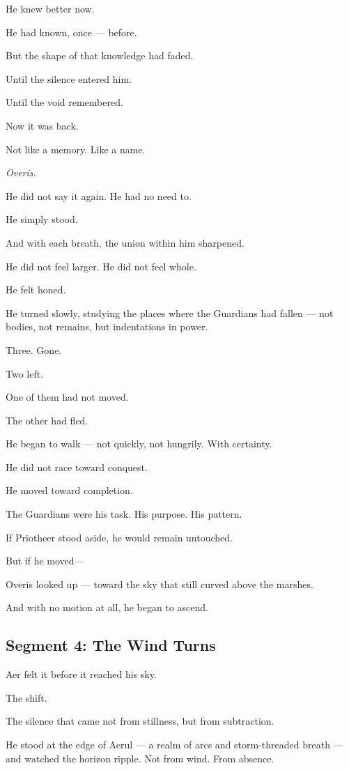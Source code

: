 \documentclass[9pt]{article}
\begin{document}
He knew better now.

He had known, once — before.

But the shape of that knowledge had faded.

Until the silence entered him.

Until the void remembered.

Now it was back.

Not like a memory. Like a name.

\emph{Overis.}

He did not say it again. He had no need to.

He simply stood.

And with each breath, the union within him sharpened.

He did not feel larger. He did not feel whole.

He felt honed.

He turned slowly, studying the places where the Guardians had fallen — not bodies, not remains, but indentations in power.

Three. Gone.

Two left.

One of them had not moved.

The other had fled.

He began to walk — not quickly, not hungrily. With certainty.

He did not race toward conquest.

He moved toward completion.

The Guardians were his task. His purpose. His pattern.

If Priotheer stood aside, he would remain untouched.

But if he moved—

Overis looked up — toward the sky that still curved above the marshes.

And with no motion at all, he began to ascend.

\newpage

\subsection*{Segment 4: The Wind Turns}

Aer felt it before it reached his sky.

The shift.

The silence that came not from stillness, but from subtraction.

He stood at the edge of Aerul — a realm of arcs and storm-threaded breath — and watched the horizon ripple. Not from wind. From absence.
\end{document}
